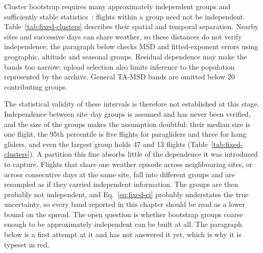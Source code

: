 Cluster bootstrap requires many approximately independent groups and sufficiently
stable statistics~\cite{cameron_miller2015}; flights within a group need not be
independent. Table~\ref{tab:fixed-clusters} describes their spatial and temporal
separation. Nearby sites and successive days can share weather, so these distances
do not verify independence; the paragraph below checks MSD and fitted-exponent errors using geographic,
altitude and seasonal groups. Residual dependence may make the bands
too narrow; upload selection also limits inference to the population represented
by the archive. General TA-MSD bands are omitted below 20 contributing groups.

The statistical validity of these intervals is therefore not established at this
stage. Independence between site--day groups is assumed and has never been verified,
and the size of the groups makes the assumption doubtful: their median size is one
flight, the 95th percentile is five flights for paragliders and three for hang
gliders, and even the largest group holds 47 and 13 flights
(Table~\ref{tab:fixed-clusters}). A partition this fine absorbs little of the
dependence it was introduced to capture. Flights that share one weather episode
across neighbouring sites, or across consecutive days at the same site, fall into
different groups and are resampled as if they carried independent information. The
groups are then probably not independent, and Eq.~\eqref{eq:fixed-ci} probably
understates the true uncertainty, so every band reported in this chapter should be
read as a lower bound on the spread. The open question is whether bootstrap groups
coarse enough to be approximately independent can be built at all. The paragraph
below is a first attempt at it and has not answered it yet, which is why it is
typeset in red.

\begin{table}[htbp]
 \centering\small\setlength{\tabcolsep}{4pt}
 
 \caption{Site--day diagnostics in the main cohort. Distances refer to the nearest
 other catalogue site represented on the same date; time gaps refer to the previous
 observed date at the same site. Distances and time gaps are reported as median
 [10th, 90th percentile].
 Cohort group counts are in Table~\ref{tab:fixed-cohorts}.}
 \label{tab:fixed-clusters}
\end{table}

